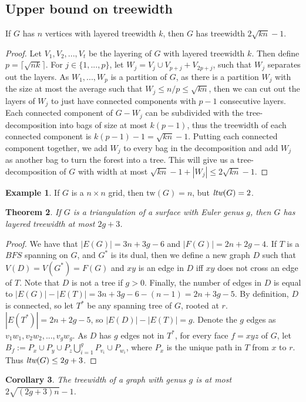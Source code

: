 \documentclass[]{article}
\newcommand{\tw}{\text{tw}}
\newtheorem{theorem}{Theorem}
\newtheorem{corollary}[theorem]{Corollary}
\theoremstyle{definition}
\newtheorem{example}[theorem]{Example}
\numberwithin{theorem}{section}
\numberwithin{equation}{section}
\begin{document}
\subsection{Upper bound on treewidth}
If $G$ has $n$ vertices with layered treewidth $k$, then $G$ has treewidth $2 \sqrt{kn} - 1$.
\begin{proof}
	Let $V_1, V_2, ..., V_t$ be the layering of $G$ with layered treewidth $k$. Then define $p = \lceil \sqrt{nk} \rceil$. For $j \in \lbrace 1, ..., p \rbrace$, let $W_j = V_j \cup V_{p + j} + V_{2p + j}$, such that $W_j$ separates out the layers. As $W_1, ..., W_p$ is a partition of $G$, as there is a partition $W_j$ with the size at most the average such that $W_j \leq n/p \leq \sqrt{kn}$, then we can cut out the layers of $W_j$ to just have connected components with $p-1$ consecutive layers. Each connected component of $G - W_j$ can be subdivided with the tree-decomposition into bags of size at most $k(p-1)$, thus the treewidth of each connected component is $k(p-1) - 1 = \sqrt{kn} - 1$. Putting each connected component together, we add $W_j$ to every bag in the decomposition and add $W_j$ as another bag to turn the forest into a tree. This will give us a tree-decomposition of $G$ with width at most $\sqrt{kn} - 1 + |W_j| \leq 2 \sqrt{kn} - 1$. 
\end{proof}

\begin{example}
	If $G$ is a $n \times n$ grid, then $\tw(G) = n$, but $\textit{ltw}(G) = 2$. 
\end{example}

\begin{theorem}
	If $G$ is a triangulation of a surface with Euler genus $g$, then $G$ has layered treewidth at most $2g + 3$. 
\end{theorem}

\begin{proof}
	We have that $|E(G)| = 3n + 3g - 6$ and $|F(G)| = 2n + 2g - 4$. If $T$ is a $BFS$ spanning on $G$, and $G^*$ is its dual, then we define a new graph $D$ such that $V(D) = V(G^*) = F(G)$ and $xy$ is an edge in $D$ iff $xy$ does not cross an edge of $T$. Note that $D$ is not a tree if $g > 0 $. Finally, the number of edges in $D$ is equal to $|E(G)| - |E(T)| = 3n + 3g - 6 - (n-1) = 2n + 3g - 5$. By definition, $D$ is connected, so let $T^*$ be any spanning tree of $G$, rooted at $r$. $|E(T^*)| = 2n + 2g - 5$, so $|E(D)| - |E(T)| = g$. Denote the $g$ edges as $v_1w_1, v_2w_2, ..., v_gw_g$. As $D$ has $g$ edges not in $T^*$, for every face $f = xyz$ of $G$, let $B_f := P_x \cup P_y \cup P_z \bigcup_{i = 1}^g P_{v_i} \cup P_{w_i}$, where $P_x$ is the unique path in $T$ from $x$ to $r$. Thus $\textit{ltw}(G) \leq 2g + 3$. 
\end{proof}
\begin{corollary}
	The treewidth of a graph with genus $g$ is at most $2\sqrt{(2g + 3) n } -1$. 
\end{corollary}
\end{document}
